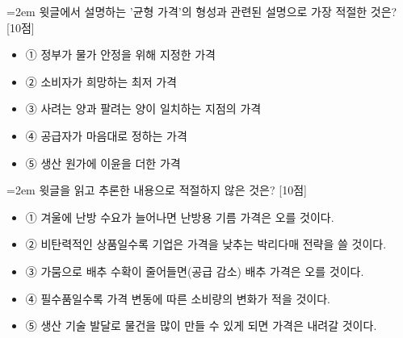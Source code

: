 \documentclass[11pt,a4paper]{article}
\newcommand{\qnum}[1]{%
  \tikz[baseline=(num.base)]{%
    \node[circle, fill=numCircle, text=white, inner sep=0pt,
          minimum size=18pt, font=\small\bfseries] (num) {#1};%
  }%
}
\newcommand{\pts}[1]{%
  \hfill\textcolor{ptsBadge}{[#1점]}%
}
\begin{document}
\vspace{4mm}
\begin{minipage}{\columnwidth}
{\hangindent=2em
\qnum{14}\enspace 윗글에서 설명하는 '균형 가격'의 형성과 관련된 설명으로 가장 적절한 것은? \pts{10}
\par}

\vspace{3mm}
\begin{itemize}[leftmargin=2.5em, labelsep=0.3em, label={}, itemsep=4pt, parsep=1pt, topsep=0pt]
  \item ① 정부가 물가 안정을 위해 지정한 가격
  \item ② 소비자가 희망하는 최저 가격
  \item ③ 사려는 양과 팔려는 양이 일치하는 지점의 가격
  \item ④ 공급자가 마음대로 정하는 가격
  \item ⑤ 생산 원가에 이윤을 더한 가격
\end{itemize}
\end{minipage}
\vspace{4mm}

\vspace{4mm}
\begin{minipage}{\columnwidth}
{\hangindent=2em
\qnum{15}\enspace 윗글을 읽고 추론한 내용으로 적절하지 않은 것은? \pts{10}
\par}

\vspace{3mm}
\begin{itemize}[leftmargin=2.5em, labelsep=0.3em, label={}, itemsep=4pt, parsep=1pt, topsep=0pt]
  \item ① 겨울에 난방 수요가 늘어나면 난방용 기름 가격은 오를 것이다.
  \item ② 비탄력적인 상품일수록 기업은 가격을 낮추는 박리다매 전략을 쓸 것이다.
  \item ③ 가뭄으로 배추 수확이 줄어들면(공급 감소) 배추 가격은 오를 것이다.
  \item ④ 필수품일수록 가격 변동에 따른 소비량의 변화가 적을 것이다.
  \item ⑤ 생산 기술 발달로 물건을 많이 만들 수 있게 되면 가격은 내려갈 것이다.
\end{itemize}
\end{minipage}
\vspace{4mm}
\end{document}
